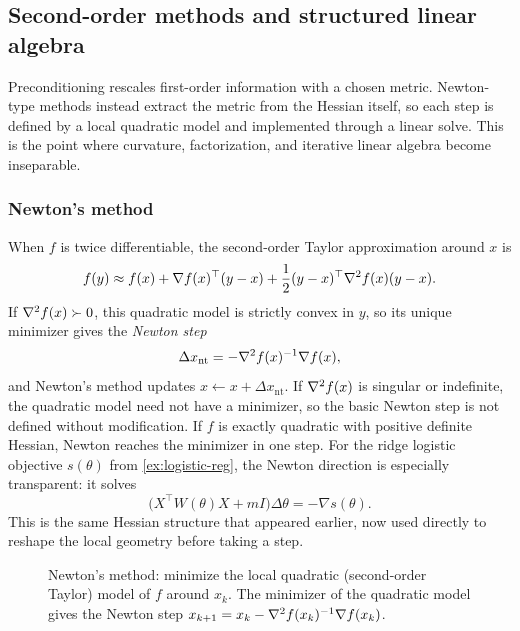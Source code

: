 \subsection{Second-order methods and structured linear algebra}
\label{subsec:second-order-methods}

Preconditioning rescales first-order information with a chosen metric.
Newton-type methods instead extract the metric from the Hessian itself, so each step is defined by a local quadratic model and implemented through a linear solve.
This is the point where curvature, factorization, and iterative linear algebra become inseparable.

\subsubsection{Newton's method}
\label{subsec:newton}

When $f$ is twice differentiable, the second-order Taylor approximation around $x$ is
\begin{equation}
  f(y) \approx f(x) + \nabla f(x)^\top (y-x) + \frac{1}{2}(y-x)^\top \nabla^2 f(x) (y-x).
  \label{eq:taylor-2}
\end{equation}
If $\nabla^2 f(x)\succ 0$, this quadratic model is strictly convex in $y$, so its unique minimizer gives the \emph{Newton step}
\begin{equation}
  \Delta x_{\mathrm{nt}} = -\nabla^2 f(x)^{-1} \nabla f(x),
  \label{eq:newton-step}
\end{equation}
and Newton's method updates $x \leftarrow x + \Delta x_{\mathrm{nt}}$.
If $\nabla^2 f(x)$ is singular or indefinite, the quadratic model need not have a minimizer, so the basic Newton step is not defined without modification.
If $f$ is exactly quadratic with positive definite Hessian, Newton reaches the minimizer in one step.
For the ridge logistic objective $s(\theta)$ from \cref{ex:logistic-reg}, the Newton direction is especially transparent: it solves
\[
  \bigl(X^\top W(\theta)X + mI\bigr)\Delta\theta = -\nabla s(\theta).
\]
This is the same Hessian structure that appeared earlier, now used directly to reshape the local geometry before taking a step.

\begin{figure}[t]
  \centering
  
  \caption{Newton's method: minimize the local quadratic (second-order Taylor) model of $f$ around $x_k$.
  The minimizer of the quadratic model gives the Newton step $x_{k+1}=x_k-\nabla^2 f(x_k)^{-1}\nabla f(x_k)$.}
  \label{fig:newton-quadratic-model}
\end{figure}


